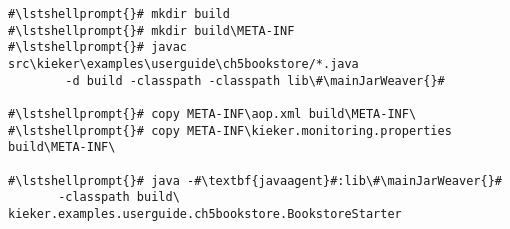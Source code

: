 \begin{lstlisting}[caption=Commands to compile and run the annotated Bookstore under Windows, label=lst:traceAnalysisCompileRunExample1Win]
#\lstshellprompt{}# mkdir build
#\lstshellprompt{}# mkdir build\META-INF
#\lstshellprompt{}# javac src\kieker\examples\userguide\ch5bookstore/*.java
        -d build -classpath -classpath lib\#\mainJarWeaver{}#

#\lstshellprompt{}# copy META-INF\aop.xml build\META-INF\
#\lstshellprompt{}# copy META-INF\kieker.monitoring.properties build\META-INF\

#\lstshellprompt{}# java -#\textbf{javaagent}#:lib\#\mainJarWeaver{}#
       -classpath build\ kieker.examples.userguide.ch5bookstore.BookstoreStarter
\end{lstlisting}
